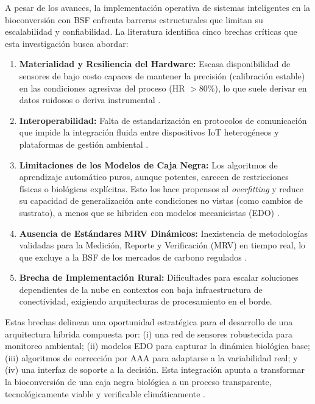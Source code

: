 A pesar de los avances, la implementación operativa de sistemas inteligentes en la bioconversión con BSF enfrenta barreras estructurales que limitan su escalabilidad y confiabilidad. La literatura identifica cinco brechas críticas que esta investigación busca abordar:

\begin{enumerate}
    \item \textbf{Materialidad y Resiliencia del Hardware:} Escasa disponibilidad de sensores de bajo costo capaces de mantener la precisión (calibración estable) en las condiciones agresivas del proceso (HR $>80\%$), lo que suele derivar en datos ruidosos o deriva instrumental \cite{AgricultureClimateChangea}.
    \item \textbf{Interoperabilidad:} Falta de estandarización en protocolos de comunicación que impide la integración fluida entre dispositivos IoT heterogéneos y plataformas de gestión ambiental \cite{vanIntegrationInternetofThingsSustainable2022a}.
    \item \textbf{Limitaciones de los Modelos de Caja Negra:} Los algoritmos de aprendizaje automático puros, aunque potentes, carecen de restricciones físicas o biológicas explícitas. Esto los hace propensos al \textit{overfitting} y reduce su capacidad de generalización ante condiciones no vistas (como cambios de sustrato), a menos que se hibriden con modelos mecanicistas (EDO) \cite{weichertReviewMachineLearning2019}.
    \item \textbf{Ausencia de Estándares MRV Dinámicos:} Inexistencia de metodologías validadas para la Medición, Reporte y Verificación (MRV) en tiempo real, lo que excluye a la BSF de los mercados de carbono regulados \cite{herrinCollateralDataQualitya}.
    \item \textbf{Brecha de Implementación Rural:} Dificultades para escalar soluciones dependientes de la nube en contextos con baja infraestructura de conectividad, exigiendo arquitecturas de procesamiento en el borde.
\end{enumerate}

Estas brechas delinean una oportunidad estratégica para el desarrollo de una arquitectura híbrida compuesta por: (i) una red de sensores robustecida para monitoreo ambiental; (ii) modelos EDO para capturar la dinámica biológica base; (iii) algoritmos de corrección por AAA para adaptarse a la variabilidad real; y (iv) una interfaz de soporte a la decisión. Esta integración apunta a transformar la bioconversión de una caja negra biológica a un proceso transparente, tecnológicamente viable y verificable climáticamente \cite{kamilarisReviewPracticeBig2017}.
